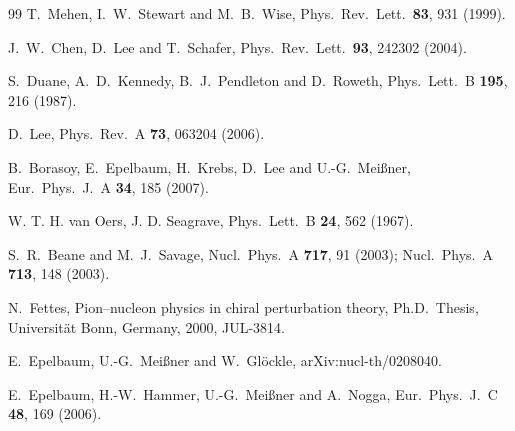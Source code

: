 \documentclass[aps,rmp,nofootinbib,twocolumn,floatfix]{revtex4}
\begin{document}
\begin{thebibliography}{99}
  T.~Mehen, I.~W.~Stewart and M.~B.~Wise,
  Phys.\ Rev.\ Lett.\  {\bf 83}, 931 (1999).

  J.~W.~Chen, D.~Lee and T.~Schafer,
  Phys.\ Rev.\ Lett.\  {\bf 93}, 242302 (2004).

  S.~Duane, A.~D.~Kennedy, B.~J.~Pendleton and D.~Roweth,
  Phys.\ Lett.\  B {\bf 195}, 216 (1987).

  D.~Lee,
  Phys.\ Rev.\  A {\bf 73}, 063204 (2006).

  B.~Borasoy, E.~Epelbaum, H.~Krebs, D.~Lee and U.-G.~Mei\ss ner,
  Eur.\ Phys.\ J.\  A {\bf 34}, 185 (2007).

W. T. H. van Oers, J. D. Seagrave, Phys.\ Lett.\ B {\bf 24}, 562 (1967). 


S.~R.~Beane and M.~J.~Savage,
        Nucl.\ Phys.\ A {\bf 717}, 91 (2003);
Nucl.\ Phys.\ A {\bf 713}, 148 (2003).

  N.~Fettes, 
  Pion--nucleon physics in chiral perturbation theory, Ph.D.~Thesis, 
  Universit\"at Bonn, Germany, 2000, JUL-3814.

  E.~Epelbaum, U.-G.~Mei{\ss}ner and W.~Gl\"ockle,
  arXiv:nucl-th/0208040.

  E.~Epelbaum, H.-W.~Hammer, U.-G.~Mei\ss ner and A.~Nogga,
  Eur.\ Phys.\ J.\  C {\bf 48}, 169 (2006).


\end{thebibliography}
\end{document}

